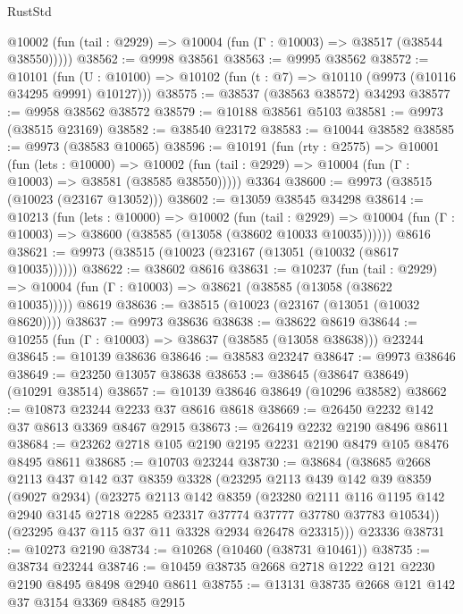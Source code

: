 \begin{lexlean}{RustStd}
\begin{coremodule}
      @10002 (fun (tail : @2929) => @10004 (fun (Γ : @10003) => @38517 (@38544 @38550)))))
@38562 := @9998 @38561
@38563 := @9995 @38562
@38572 := @10101
    (fun (U : @10100) => @10102 (fun (t : @7) => @10110 (@9973 (@10116 @34295 @9991) @10127)))
@38575 := @38537 (@38563 @38572) @34293
@38577 := @9958 @38562 @38572
@38579 := @10188 @38561 @5103
@38581 := @9973 (@38515 @23169)
@38582 := @38540 @23172
@38583 := @10044 @38582
@38585 := @9973 (@38583 @10065)
@38596 := @10191
    (fun (rty : @2575) =>
    @10001
      (fun (lets : @10000) =>
      @10002 (fun (tail : @2929) => @10004 (fun (Γ : @10003) => @38581 (@38585 @38550)))))
    @3364
@38600 := @9973 (@38515 (@10023 (@23167 @13052)))
@38602 := @13059 @38545 @34298
@38614 := @10213
    (fun (lets : @10000) =>
    @10002
      (fun (tail : @2929) =>
      @10004 (fun (Γ : @10003) => @38600 (@38585 (@13058 (@38602 @10033 @10035))))))
    @8616
@38621 := @9973 (@38515 (@10023 (@23167 (@13051 (@10032 (@8617 @10035))))))
@38622 := @38602 @8616
@38631 := @10237
    (fun (tail : @2929) => @10004 (fun (Γ : @10003) => @38621 (@38585 (@13058 (@38622 @10035)))))
    @8619
@38636 := @38515 (@10023 (@23167 (@13051 (@10032 @8620))))
@38637 := @9973 @38636
@38638 := @38622 @8619
@38644 := @10255 (fun (Γ : @10003) => @38637 (@38585 (@13058 @38638))) @23244
@38645 := @10139 @38636
@38646 := @38583 @23247
@38647 := @9973 @38646
@38649 := @23250 @13057 @38638
@38653 := @38645 (@38647 @38649) (@10291 @38514)
@38657 := @10139 @38646 @38649 (@10296 @38582)
@38662 := @10873 @23244 @2233 @37 @8616 @8618
@38669 := @26450 @2232 @142 @37 @8613 @3369 @8467 @2915
@38673 := @26419 @2232 @2190 @8496 @8611
@38684 := @23262 @2718 @105 @2190 @2195 @2231 @2190 @8479 @105 @8476 @8495 @8611
@38685 := @10703 @23244
@38730 := @38684
    (@38685
      @2668
      @2113
      @437
      @142
      @37
      @8359
      @3328
      (@23295
        @2113
        @439
        @142
        @39
        @8359
        (@9027 @2934)
        (@23275
          @2113
          @142
          @8359
          (@23280
            @2111
            @116
            @1195
            @142
            @2940
            @3145
            @2718
            @2285
            @23317
            @37774
            @37777
            @37780
            @37783
            @10534))
        (@23295 @437 @115 @37 @11 @3328 @2934 @26478 @23315)))
    @23336
@38731 := @10273 @2190
@38734 := @10268 (@10460 (@38731 @10461))
@38735 := @38734 @23244
@38746 := @10459 @38735 @2668 @2718 @1222 @121 @2230 @2190 @8495 @8498 @2940 @8611
@38755 := @13131 @38735 @2668 @121 @142 @37 @3154 @3369 @8485 @2915

\end{coremodule}
\end{lexlean}
